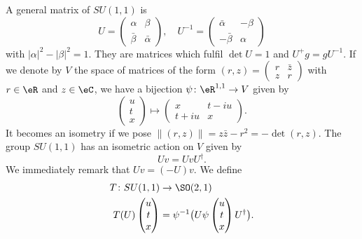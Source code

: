 A general matrix of $SU(1,1)$ is
\[
	U=\begin{pmatrix}
		\alpha & \beta \\\bar\beta&\bar\alpha
	\end{pmatrix},
	\quad
	U^{-1}=\begin{pmatrix}
		\bar\alpha & -\beta \\-\bar\beta&\alpha
	\end{pmatrix}
\]
with $| \alpha |^2 - | \beta |^2=1$. They are matrices which fulfil $\det U=1$ and $U^+g=gU^{-1}$.  If we denote by $V$ the space of matrices of the form $(r,z)=\begin{pmatrix}
		r & \bar z \\z&r
	\end{pmatrix}$ with $r\in\eR$ and $z\in\eC$, we have a bijection $\psi\colon \eR^{1,1}\to V$ given by
\[
	\begin{pmatrix}
		u \\t\\x
	\end{pmatrix}\mapsto
	\begin{pmatrix}
		x & t-iu \\ t+iu&x
	\end{pmatrix}.
\]
It becomes an isometry if we pose $\| (r,z) \|=z\bar z-r^2=-\det(r,z)$. The group $SU(1,1)$ has an isometric action on $V$ given by
\[
	Uv=UvU^{\dag}.
\]
We immediately remark that $Uv=(-U)v$. We define
\begin{equation}
	\begin{aligned}
		T\colon SU(1,1)     & \to \SO(2,1)                                     \\
		T(U)\begin{pmatrix}
			    u \\t\\x
		    \end{pmatrix} & = \psi^{-1}\big( U\psi\begin{pmatrix}
			                                          u \\t\\x
		                                          \end{pmatrix}U^{\dag} \big).
	\end{aligned}
\end{equation}

